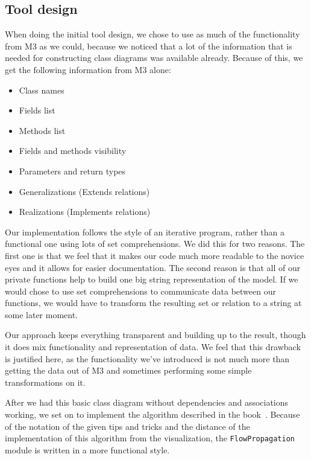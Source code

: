 \subsection{Tool design}
	When doing the initial tool design, we chose to use as much of the functionality from M3 as we could, because we noticed that a lot of the information that is needed for constructing class diagrams was available already.
	Because of this, we get the following information from M3 alone:

	\begin{itemize}
		\item Class names
		\item Fields list
		\item Methods list
		\item Fields and methods visibility
		\item Parameters and return types
		\item Generalizations (Extends relations)
		\item Realizations (Implements relations)
	\end{itemize}

	Our implementation follows the style of an iterative program, rather than a functional one using lots of set comprehensions.
	We did this for two reasons.
	The first one is that we feel that it makes our code much more readable to the novice eyes and it allows for easier documentation.
	The second reason is that all of our private functions help to build one big string representation of the model.
	If we would chose to use set comprehensions to communicate data between our functions, we would have to transform the resulting set or relation to a string at some later moment.

	Our approach keeps everything transparent and building up to the result, though it does mix functionality and representation of data.
	We feel that this drawback is justified here, as the functionality we've introduced is not much more than getting the data out of M3 and sometimes performing some simple transformations on it.
	
	After we had this basic class diagram without dependencies and associations working, we set on to implement the algorithm described in the book~\cite{rev-eng}.
	Because of the notation of the given tips and tricks and the distance of the implementation of this algorithm from the visualization, the \texttt{FlowPropagation} module is written in a more functional style.\\


